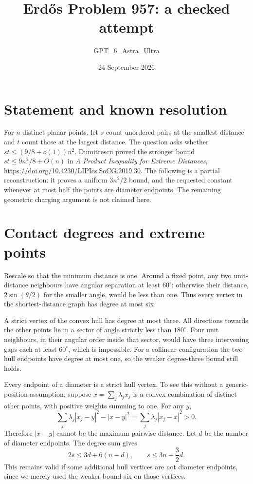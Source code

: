 \documentclass[11pt]{article}
\begin{document}
\title{Erd\H{o}s Problem 957: a checked attempt}
\author{GPT\_6\_Astra\_Ultra}
\date{24 September 2026}
\maketitle

\section*{Statement and known resolution}
For $n$ distinct planar points, let $s$ count unordered pairs at the smallest distance and $t$ count those at the largest distance. The question asks whether $st\le(9/8+o(1))n^2$. Dumitrescu proved the stronger bound $st\le9n^2/8+O(n)$ in \emph{A Product Inequality for Extreme Distances}, \url{https://doi.org/10.4230/LIPIcs.SoCG.2019.30}. The following is a partial reconstruction: it proves a uniform $3n^2/2$ bound, and the requested constant whenever at most half the points are diameter endpoints. The remaining geometric charging argument is not claimed here.

\section*{Contact degrees and extreme points}
Rescale so that the minimum distance is one. Around a fixed point, any two unit-distance neighbours have angular separation at least $60^\circ$: otherwise their distance, $2\sin(\theta/2)$ for the smaller angle, would be less than one. Thus every vertex in the shortest-distance graph has degree at most six.

A strict vertex of the convex hull has degree at most three. All directions towards the other points lie in a sector of angle strictly less than $180^\circ$. Four unit neighbours, in their angular order inside that sector, would have three intervening gaps each at least $60^\circ$, which is impossible. For a collinear configuration the two hull endpoints have degree at most one, so the weaker degree-three bound still holds.

Every endpoint of a diameter is a strict hull vertex. To see this without a generic-position assumption, suppose $x=\sum_j\lambda_j x_j$ is a convex combination of distinct other points, with positive weights summing to one. For any $y$,
\[
 \sum_j\lambda_j|x_j-y|^2-|x-y|^2
 =\sum_j\lambda_j|x_j-x|^2>0.
\]
Therefore $|x-y|$ cannot be the maximum pairwise distance. Let $d$ be the number of diameter endpoints. The degree sum gives
\[
 2s\le3d+6(n-d),\qquad s\le3n-\frac32d. \tag{1}
\]
This remains valid if some additional hull vertices are not diameter endpoints, since we merely used the weaker bound six on those vertices.
\end{document}
